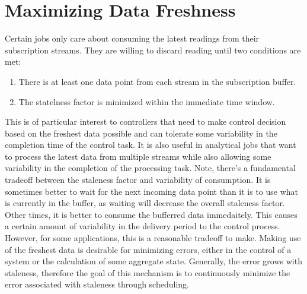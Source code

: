 \section{Maximizing Data Freshness}

Certain jobs only care about consuming the latest readings from their subscription streams.  They are willing to discard reading until two
conditions are met:

\begin{enumerate}
\item There is at least one data point from each stream in the subscription buffer.
\item The statelness factor is minimized within the immediate time window.
\end{enumerate}

This is of particular interest to controllers that need to make control decision based on the freshest data possible and can tolerate some variability
in the completion time of the control task.  It is also useful in analytical jobs that want to process the latest data from multiple streams while also
allowing some variability in the completion of the processing task.  Note, there's a fundamental tradeoff
between the staleness factor and variability of consumption.  It is sometimes better to wait for the next incoming data point than it is to use what
is currently in the buffer, as waiting will decrease the overall staleness factor.  Other times, it is better to consume the bufferred data immedaitely.
This causes a certain amount of variability in the delivery period to the control process.  However, for some applications, this is a reasonable tradeoff
to make.  Making use of the freshest data is desirable for minimizing errors, either in the control of a system or the calculation of some aggregate state.
Generally, the error grows with staleness, therefore the goal of this mechanism is to continuously minimize the error associated with staleness through
scheduling.


